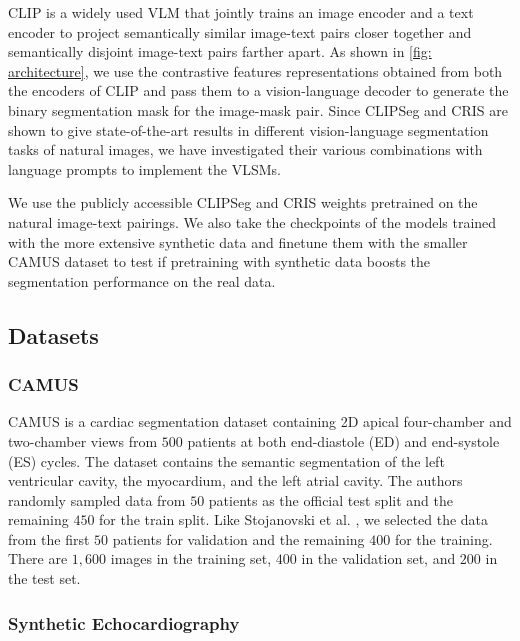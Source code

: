 \documentclass[runningheads]{llncs}
\begin{document}
CLIP \cite{radford2021learning} is a widely used VLM that jointly trains an image encoder and a text encoder to project semantically similar image-text pairs closer together and semantically disjoint image-text pairs farther apart.
As shown in \cref{fig: architecture}, we use the contrastive features representations obtained from both the encoders of CLIP and pass them to a vision-language decoder to generate the binary segmentation mask for the image-mask pair.
Since CLIPSeg \cite{luddecke2022image} and CRIS \cite{wang2022cris} are shown to give state-of-the-art results in different vision-language segmentation tasks of natural images, we have investigated their various combinations with language prompts to implement the VLSMs.

We use the publicly accessible CLIPSeg and CRIS weights pretrained on the natural image-text pairings.
We also take the checkpoints of the models trained with the more extensive synthetic data and finetune them with the smaller CAMUS dataset to test if pretraining with synthetic data boosts the segmentation performance on the real data.

\subsection{Datasets}
\label{sec:datasets}

\subsubsection{CAMUS}

CAMUS \cite{leclerc2019deep} is a cardiac segmentation dataset containing 2D apical four-chamber and two-chamber views from $500$ patients at both end-diastole (ED) and end-systole (ES) cycles.
The dataset contains the semantic segmentation of the left ventricular cavity, the myocardium, and the left atrial cavity.
The authors randomly sampled data from $50$ patients as the official test split and the remaining $450$ for the train split.
Like Stojanovski et al. \cite{stojanovski2023echo}, we selected the data from the first $50$ patients for validation and the remaining $400$ for the training.
There are $1,600$ images in the training set, $400$ in the validation set, and $200$ in the test set.

\subsubsection{Synthetic Echocardiography}
\end{document}
